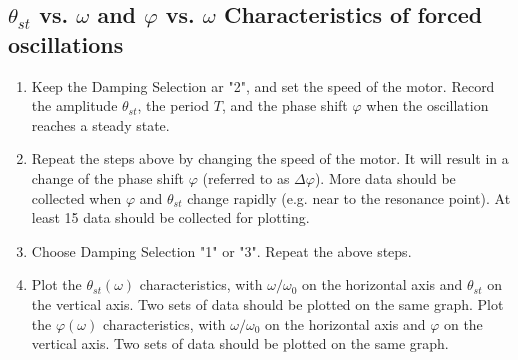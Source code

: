 \subsection{$\theta_{st}$ vs. $\omega$ and $\varphi$ vs. $\omega$ Characteristics of forced oscillations}
    \begin{enumerate}
        \item Keep the Damping Selection ar "2", and set the speed of the motor. Record the amplitude $\theta_{st}$, the period $T$, and the phase shift $\varphi$ when the oscillation reaches a steady state.
        \item Repeat the steps above by changing the speed of the motor. It will result in a change of the phase shift $\varphi$ (referred to as $\Delta \varphi$). More data should be collected when $\varphi$ and $\theta_{st}$ change rapidly (e.g. near to the resonance point). At least 15 data should be collected for plotting.
        \item Choose Damping Selection "1" or "3". Repeat the above steps.
        \item Plot the $\theta_{st} (\omega)$ characteristics, with $\omega/\omega_0$ on the horizontal axis and $\theta_{st}$ on the vertical axis. Two sets of data should be plotted on the same graph.
        Plot the $\varphi (\omega)$ characteristics, with $\omega/\omega_0$ on the horizontal axis and $\varphi$ on the vertical axis. Two sets of data should be plotted on the same graph.
    \end{enumerate}